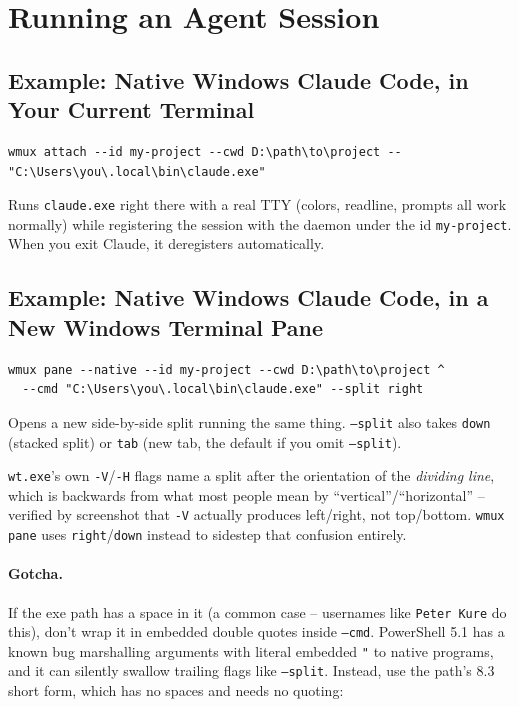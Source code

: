 \documentclass{article}
\begin{document}
\section{Running an Agent Session}

\subsection{Example: Native Windows Claude Code, in Your Current Terminal}

\begin{lstlisting}
wmux attach --id my-project --cwd D:\path\to\project -- "C:\Users\you\.local\bin\claude.exe"
\end{lstlisting}

Runs \texttt{claude.exe} right there with a real TTY (colors, readline, prompts all work normally) while registering the session with the daemon under the id \texttt{my-project}. When you exit Claude, it deregisters automatically.

\subsection{Example: Native Windows Claude Code, in a New Windows Terminal Pane}

\begin{lstlisting}
wmux pane --native --id my-project --cwd D:\path\to\project ^
  --cmd "C:\Users\you\.local\bin\claude.exe" --split right
\end{lstlisting}

Opens a new side-by-side split running the same thing. \texttt{--split} also takes \texttt{down} (stacked split) or \texttt{tab} (new tab, the default if you omit \texttt{--split}).

\texttt{wt.exe}'s own \texttt{-V}/\texttt{-H} flags name a split after the orientation of the \emph{dividing line}, which is backwards from what most people mean by ``vertical''/``horizontal'' -- verified by screenshot that \texttt{-V} actually produces left/right, not top/bottom. \texttt{wmux pane} uses \texttt{right}/\texttt{down} instead to sidestep that confusion entirely.

\paragraph{Gotcha.} If the exe path has a space in it (a common case -- usernames like \texttt{Peter Kure} do this), don't wrap it in embedded double quotes inside \texttt{--cmd}. PowerShell 5.1 has a known bug marshalling arguments with literal embedded \texttt{"} to native programs, and it can silently swallow trailing flags like \texttt{--split}. Instead, use the path's 8.3 short form, which has no spaces and needs no quoting:
\end{document}
